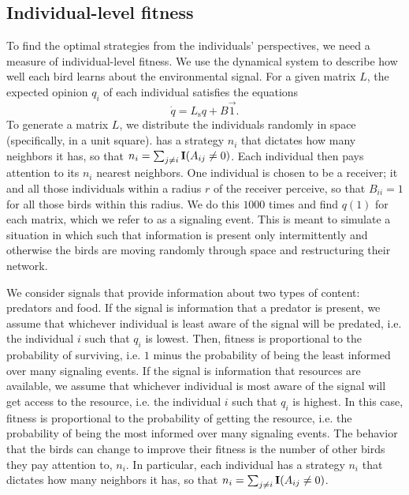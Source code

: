 \documentclass{article}
\begin{document}
\subsection{Individual-level fitness }
To find the optimal strategies from the individuals' perspectives, we need a measure of individual-level fitness. We use the dynamical system to describe how well each bird learns about the environmental signal. For a given matrix $L$, the expected opinion $q_i$ of each individual satisfies the equations
\begin{equation}
\dot{q}=L_\text{s}q+B\vec{1}. \label{expected_opinion}
\end{equation}
To generate a matrix $L$, we distribute the individuals randomly in space (specifically, in a unit square). has a strategy $n_i$ that dictates how many neighbors it has, so that $n_i=\sum_{j\neq i}{\bf I}(A_{ij}\neq 0)$.    Each individual then pays attention to its $n_i$ nearest neighbors.  One individual is chosen to be a receiver; it and all those individuals within a radius $r$ of the receiver perceive, so that $B_{ii}=1$ for all those birds within this radius. We do this $1000$ times and find $q(1)$ for each matrix, which we refer to as a signaling event. This is meant to simulate a situation in which such that information is present only intermittently and otherwise the birds are moving randomly through space and restructuring their network. 

We consider signals that provide information about two types of content: predators and food.  If the signal is information that a predator is present, we assume that whichever individual is least aware of the signal will be predated, i.e. the individual $i$ such that $q_i$ is lowest. Then, fitness is proportional to the probability of surviving, i.e. $1$ minus the probability of being the least informed over many signaling events. If the signal is information that resources are available, we assume that whichever individual is most aware of the signal will get access to the resource, i.e. the individual $i$ such that $q_i$ is highest. In this case, fitness is proportional to the probability of getting the resource, i.e. the probability of being the most informed over many signaling events. The behavior that the birds can change to improve their fitness is the number of other birds they pay attention to, $n_i$. In particular, each individual has a strategy $n_i$ that dictates how many neighbors it has, so that $n_i=\sum_{j\neq i}{\bf I}(A_{ij}\neq 0)$.    
\end{document}
